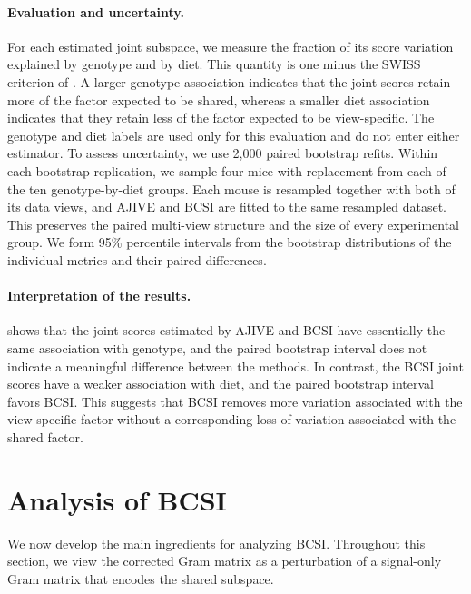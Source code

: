 \documentclass[11pt]{article}
\begin{document}
\paragraph{Evaluation and uncertainty.}
For each estimated joint subspace, we measure the fraction of its score
variation explained by genotype and by diet. This quantity is one minus
the SWISS criterion of \citet{cabanski2010swiss}. A larger genotype
association indicates that the joint scores retain more of the factor
expected to be shared, whereas a smaller diet association indicates
that they retain less of the factor expected to be view-specific. The
genotype and diet labels are used only for this evaluation and do not
enter either estimator. To assess uncertainty, we use 2,000 paired
bootstrap refits. Within each bootstrap replication, we sample four mice
with replacement from each of the ten genotype-by-diet groups. Each
mouse is resampled together with both of its data views, and AJIVE and
BCSI are fitted to the same resampled dataset. This preserves the paired
multi-view structure and the size of every experimental group. We form
95\% percentile intervals from the bootstrap distributions of the
individual metrics and their paired differences.


\paragraph{Interpretation of the results.}
 shows that the joint scores estimated
by AJIVE and BCSI have essentially the same association with genotype,
and the paired bootstrap interval does not indicate a meaningful
difference between the methods. In contrast, the BCSI joint scores have
a weaker association with diet, and the paired bootstrap interval favors
BCSI. This suggests that BCSI removes more variation associated with the
view-specific factor without a corresponding loss of variation associated
with the shared factor. 





\section{Analysis of BCSI}
\label{sec:upper-analysis}

We now develop the main ingredients for analyzing BCSI. Throughout this
section, we view the corrected Gram matrix as a perturbation of a signal-only
Gram matrix that encodes the shared subspace.
\end{document}
